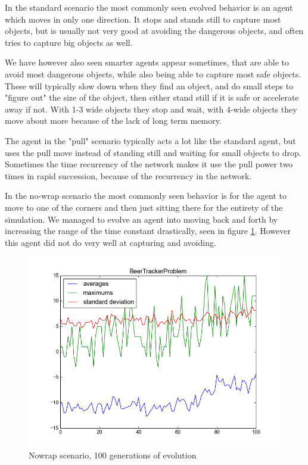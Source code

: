 \documentclass[twoside]{article}
\begin{document}
\begin{multicols}{2}
    In the standard scenario the most commonly seen evolved behavior is an agent which moves in only one direction.
    It stops and stands still to capture most objects,
    but is usually not very good at avoiding the dangerous objects,
    and often tries to capture big objects as well.

    We have however also seen smarter agents appear sometimes,
    that are able to avoid most dangerous objects,
    while also being able to capture most safe objects.
    These will typically slow down when they find an object,
    and do small steps to "figure out" the size of the object,
    then either stand still if it is safe or accelerate away if not.
    With 1-3 wide objects they stop and wait, with 4-wide objects they move about more because of the lack of long term memory.

    The agent in the "pull" scenario typically acts a lot like the standard agent,
    but uses the pull move instead of standing still and waiting for small objects to drop.
    Sometimes the time recurrency of the network makes it use the pull power two times in rapid succession, because of the recurrency in the network.

    In the no-wrap scenario the most commonly seen behavior is for the agent to move to one of the corners and then just sitting there for the entirety of the simulation.
    We managed to evolve an agent into moving back and forth by increasing the range of the time constant drastically, seen in figure \ref{nowrap}.
    However this agent did not do very well at capturing and avoiding.

    \begin{figure}[H]
        \centering
        \includegraphics[width=\linewidth]{images/nowrap_highT}
        \caption{Nowrap scenario, 100 generations of evolution}
        \label{nowrap}
    \end{figure}


\end{multicols}
\end{document}
